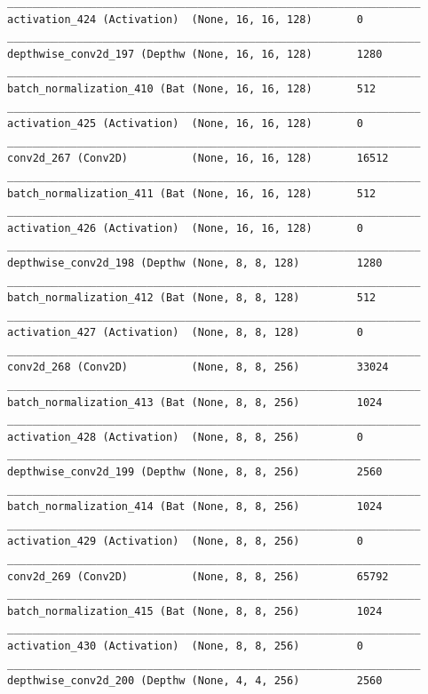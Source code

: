 \documentclass{article}
\begin{document}
\begin{appendices}
\begin{lstlisting}
_________________________________________________________________
activation_424 (Activation)  (None, 16, 16, 128)       0         
_________________________________________________________________
depthwise_conv2d_197 (Depthw (None, 16, 16, 128)       1280      
_________________________________________________________________
batch_normalization_410 (Bat (None, 16, 16, 128)       512       
_________________________________________________________________
activation_425 (Activation)  (None, 16, 16, 128)       0         
_________________________________________________________________
conv2d_267 (Conv2D)          (None, 16, 16, 128)       16512     
_________________________________________________________________
batch_normalization_411 (Bat (None, 16, 16, 128)       512       
_________________________________________________________________
activation_426 (Activation)  (None, 16, 16, 128)       0         
_________________________________________________________________
depthwise_conv2d_198 (Depthw (None, 8, 8, 128)         1280      
_________________________________________________________________
batch_normalization_412 (Bat (None, 8, 8, 128)         512       
_________________________________________________________________
activation_427 (Activation)  (None, 8, 8, 128)         0         
_________________________________________________________________
conv2d_268 (Conv2D)          (None, 8, 8, 256)         33024     
_________________________________________________________________
batch_normalization_413 (Bat (None, 8, 8, 256)         1024      
_________________________________________________________________
activation_428 (Activation)  (None, 8, 8, 256)         0         
_________________________________________________________________
depthwise_conv2d_199 (Depthw (None, 8, 8, 256)         2560      
_________________________________________________________________
batch_normalization_414 (Bat (None, 8, 8, 256)         1024      
_________________________________________________________________
activation_429 (Activation)  (None, 8, 8, 256)         0         
_________________________________________________________________
conv2d_269 (Conv2D)          (None, 8, 8, 256)         65792     
_________________________________________________________________
batch_normalization_415 (Bat (None, 8, 8, 256)         1024      
_________________________________________________________________
activation_430 (Activation)  (None, 8, 8, 256)         0         
_________________________________________________________________
depthwise_conv2d_200 (Depthw (None, 4, 4, 256)         2560      

\end{lstlisting}
\end{appendices}
\end{document}
